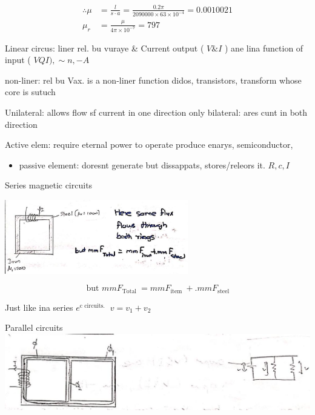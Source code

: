 \documentclass[12pt, a4paper]{article}
\newcommand{\figwidth}{8cm}
\begin{document}
$$
	\begin{aligned}
		\therefore \mu & =\frac{l}{s \cdot a}=\frac{0.2 \pi}{2090000 \times 63 \times 10^{-4}}=0.0010021 \\
		\mu_{r}        & =\frac{\mu}{4 \pi \times 10^{-7}}=797
	\end{aligned}
$$

Linear circus: liner rel. bu vuraye \& Current output ( $V \& I$ ) ane lina function of input ( $V Q I), \sim n,-A$

non-liner: rel bu Vax. is a non-liner function didos, transistors, transform whose core is sutuch

Unilateral: allows flow sf current in one direction only bilateral: ares cunt in both direction

Active elem: require eternal power to operate produce enarys, semiconductor,

\begin{itemize}
	\item passive element: doresnt generate but dissappats, stores/releors it. $R, c, I$
\end{itemize}

Series magnetic circuits

\begin{center}
	\includegraphics[max width=\figwidth]{2024_06_15_ae1c13e212c06c234cc4g-04(1)}
\end{center}

$$
	\text { but } m m F_{\text {Total }}=m m F_{\text {item }}+. m m F_{\text {steel }}
$$

Just like ina series $e^{\text {c circuits. }}$ $v=v_{1}+v_{2}$

Parallel circuits\\
\includegraphics[max width=\textwidth, center]{2024_06_15_ae1c13e212c06c234cc4g-05}
\end{document}

